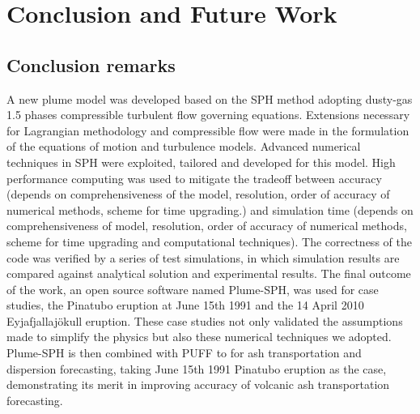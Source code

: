 \chapter{Conclusion and Future Work} \label{chapter:Future-Work}

\section{Conclusion remarks}
A new plume model was developed based on the SPH method adopting dusty-gas 1.5 phases compressible turbulent flow governing equations. Extensions necessary for Lagrangian methodology and compressible flow were made in the formulation of the equations of motion and turbulence models. Advanced numerical techniques in SPH were exploited, tailored and developed for this model. High performance computing was used to mitigate the tradeoff between accuracy (depends on comprehensiveness of the model, resolution, order of accuracy of numerical methods, scheme for time upgrading.) and simulation time (depends on comprehensiveness of model, resolution, order of accuracy of numerical methods, scheme for time upgrading and computational techniques). The correctness of the code was verified by a series of test simulations, in which simulation results are compared against analytical solution and experimental results. The final outcome of the work, an open source software named Plume-SPH, was used for case studies, the Pinatubo eruption at June 15th 1991 and the 14 April 2010 Eyjafjallaj\"{o}kull
eruption. These case studies not only validated the assumptions made to simplify the physics but also these numerical techniques we adopted. Plume-SPH is then combined with PUFF to for ash transportation and dispersion forecasting, taking June 15th 1991 Pinatubo eruption as the case, demonstrating its merit in improving accuracy of volcanic ash transportation forecasting.

